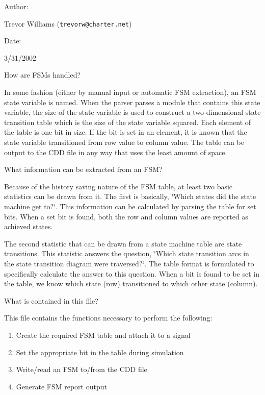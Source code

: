 \begin{Desc}
\item[Author: ]\par
Trevor Williams ({\tt trevorw@charter.net}) \end{Desc}
\begin{Desc}
\item[Date: ]\par
3/31/2002\end{Desc}
\begin{Desc}
\item[How are FSMs handled?]\par
 In some fashion (either by manual input or automatic FSM extraction), an FSM state variable is named. When the parser parses a module that contains this state variable, the size of the state variable is used to construct a two-dimensional state transition table which is the size of the state variable squared. Each element of the table is one bit in size. If the bit is set in an element, it is known that the state variable transitioned from row value to column value. The table can be output to the CDD file in any way that uses the least amount of space.\end{Desc}
\begin{Desc}
\item[What information can be extracted from an FSM?]\par
 Because of the history saving nature of the FSM table, at least two basic statistics can be drawn from it. The first is basically, \char`\"{}Which states did the state machine get to?\char`\"{}. This information can be calculated by parsing the table for set bits. When a set bit is found, both the row and column values are reported as achieved states.

 The second statistic that can be drawn from a state machine table are state transitions. This statistic answers the question, \char`\"{}Which state transition arcs in the state transition diagram were traversed?\char`\"{}. The table format is formulated to specifically calculate the answer to this question. When a bit is found to be set in the table, we know which state (row) transitioned to which other state (column).\end{Desc}
\begin{Desc}
\item[What is contained in this file?]\par
 This file contains the functions necessary to perform the following:\begin{enumerate}
\item 
Create the required FSM table and attach it to a signal\item 
Set the appropriate bit in the table during simulation\item 
Write/read an FSM to/from the CDD file\item 
Generate FSM report output\end{enumerate}
\end{Desc}


